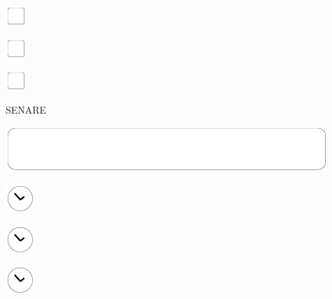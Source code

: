 \documentclass[11pt,titlepage]{article}
\begin{document}
\vspace{10mm}

\noindent
\includegraphics[]{checkbox-4mm.pdf}

\vspace{10mm}

\noindent
\includegraphics[]{checkbox-4mm.pdf}

\vspace{10mm}

\noindent
\includegraphics[]{checkbox-4mm.pdf}

\pagebreak

\small %
\hfill SENARE

\vspace{6mm}

\noindent
\includegraphics[]{mediumbox.pdf}

\vspace{15mm}

\noindent
\hspace{1mm}\includegraphics[]{clockface.pdf}

\vspace{10,5mm}

\noindent
\hspace{1mm}\includegraphics[]{clockface.pdf}

\vspace{10,5mm}

\noindent
\hspace{1mm}\includegraphics[]{clockface.pdf}
\end{document}
